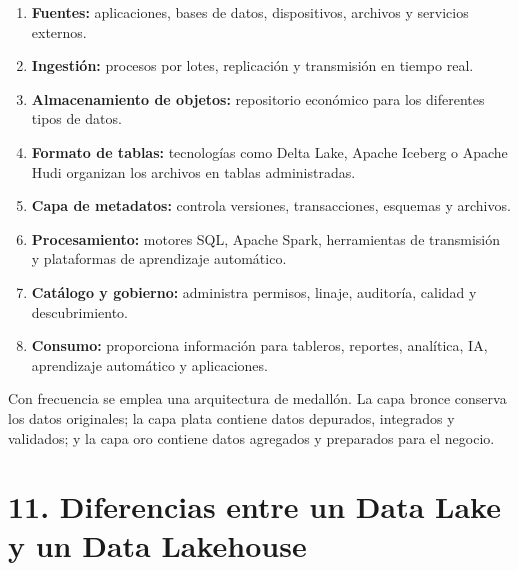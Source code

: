 \begin{enumerate}
    \item \textbf{Fuentes:} aplicaciones, bases de datos, dispositivos,
    archivos y servicios externos.

    \item \textbf{Ingestión:} procesos por lotes, replicación y transmisión en
    tiempo real.

    \item \textbf{Almacenamiento de objetos:} repositorio económico para los
    diferentes tipos de datos.

    \item \textbf{Formato de tablas:} tecnologías como Delta Lake, Apache
    Iceberg o Apache Hudi organizan los archivos en tablas administradas.

    \item \textbf{Capa de metadatos:} controla versiones, transacciones,
    esquemas y archivos.

    \item \textbf{Procesamiento:} motores SQL, Apache Spark, herramientas de
    transmisión y plataformas de aprendizaje automático.

    \item \textbf{Catálogo y gobierno:} administra permisos, linaje,
    auditoría, calidad y descubrimiento.

    \item \textbf{Consumo:} proporciona información para tableros, reportes,
    analítica, IA, aprendizaje automático y aplicaciones.
\end{enumerate}

Con frecuencia se emplea una arquitectura de medallón. La capa bronce conserva
los datos originales; la capa plata contiene datos depurados, integrados y
validados; y la capa oro contiene datos agregados y preparados para el negocio.

\section*{11. Diferencias entre un Data Lake y un Data Lakehouse}


